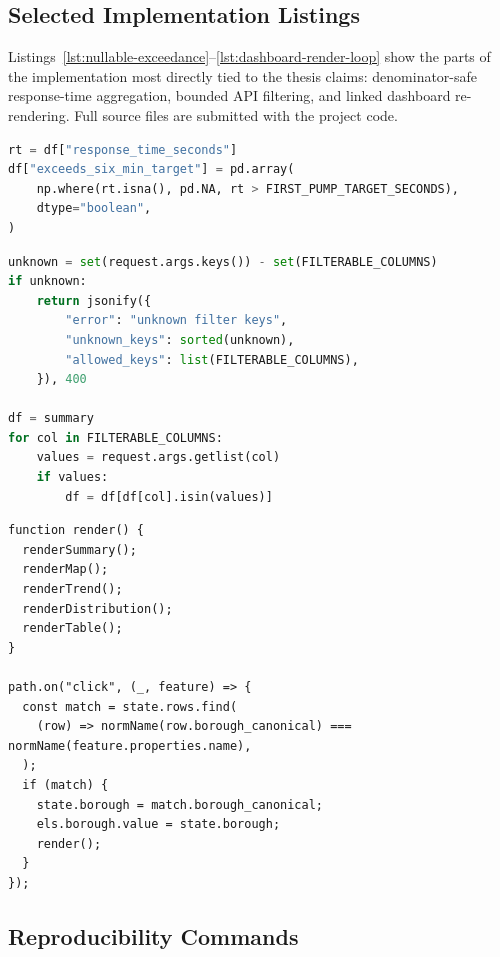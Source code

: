 \subsection{Selected Implementation Listings}

Listings~\ref{lst:nullable-exceedance}--\ref{lst:dashboard-render-loop} show the parts of the implementation most directly tied to the thesis claims: denominator-safe response-time aggregation, bounded API filtering, and linked dashboard re-rendering. Full source files are submitted with the project code.

\begin{lstlisting}[language=Python, caption={Nullable exceedance flag used to keep missing first-pump times out of the denominator.}, label={lst:nullable-exceedance}]
rt = df["response_time_seconds"]
df["exceeds_six_min_target"] = pd.array(
    np.where(rt.isna(), pd.NA, rt > FIRST_PUMP_TARGET_SECONDS),
    dtype="boolean",
)
\end{lstlisting}

\begin{lstlisting}[language=Python, caption={Borough-summary API filtering rejects unknown keys before returning aggregate rows.}, label={lst:api-filtering}]
unknown = set(request.args.keys()) - set(FILTERABLE_COLUMNS)
if unknown:
    return jsonify({
        "error": "unknown filter keys",
        "unknown_keys": sorted(unknown),
        "allowed_keys": list(FILTERABLE_COLUMNS),
    }), 400

df = summary
for col in FILTERABLE_COLUMNS:
    values = request.args.getlist(col)
    if values:
        df = df[df[col].isin(values)]
\end{lstlisting}

\begin{lstlisting}[caption={Shared dashboard state drives the linked map, trend, distribution, and ranking panels.}, label={lst:dashboard-render-loop}]
function render() {
  renderSummary();
  renderMap();
  renderTrend();
  renderDistribution();
  renderTable();
}

path.on("click", (_, feature) => {
  const match = state.rows.find(
    (row) => normName(row.borough_canonical) === normName(feature.properties.name),
  );
  if (match) {
    state.borough = match.borough_canonical;
    els.borough.value = state.borough;
    render();
  }
});
\end{lstlisting}

\subsection{Reproducibility Commands}

